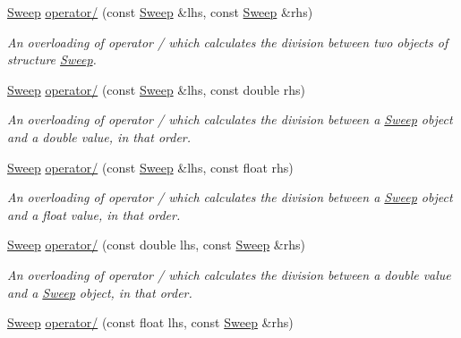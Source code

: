 \begin{DoxyCompactItemize}
\hyperlink{structSweep}{Sweep} \hyperlink{structSweep_a3e230f15cb1119940203a1a452676b74}{operator/} (const \hyperlink{structSweep}{Sweep} \&lhs, const \hyperlink{structSweep}{Sweep} \&rhs)
\begin{DoxyCompactList}\small\item\em An overloading of operator / which calculates the division between two objects of structure {\itshape \hyperlink{structSweep}{Sweep}}. \end{DoxyCompactList}\item 
\hyperlink{structSweep}{Sweep} \hyperlink{structSweep_a910534263202da65edd97a56f0b8fd05}{operator/} (const \hyperlink{structSweep}{Sweep} \&lhs, const double rhs)
\begin{DoxyCompactList}\small\item\em An overloading of operator / which calculates the division between a {\itshape \hyperlink{structSweep}{Sweep}} object and a {\itshape double} value, in that order. \end{DoxyCompactList}\item 
\mbox{\label{structSweep_a73694ded6e7ba41c367ca5f0934cbc2c}} 
\hyperlink{structSweep}{Sweep} \hyperlink{structSweep_a73694ded6e7ba41c367ca5f0934cbc2c}{operator/} (const \hyperlink{structSweep}{Sweep} \&lhs, const float rhs)
\begin{DoxyCompactList}\small\item\em An overloading of operator / which calculates the division between a {\itshape \hyperlink{structSweep}{Sweep}} object and a {\itshape float} value, in that order. \end{DoxyCompactList}\item 
\hyperlink{structSweep}{Sweep} \hyperlink{structSweep_a2129cedcd680ae14f2f5b91dbc0c1807}{operator/} (const double lhs, const \hyperlink{structSweep}{Sweep} \&rhs)
\begin{DoxyCompactList}\small\item\em An overloading of operator / which calculates the division between a {\itshape double} value and a {\itshape \hyperlink{structSweep}{Sweep}} object, in that order. \end{DoxyCompactList}\item 
\mbox{\label{structSweep_abe3c133bf246f7faebcfda286c5e1448}} 
\hyperlink{structSweep}{Sweep} \hyperlink{structSweep_abe3c133bf246f7faebcfda286c5e1448}{operator/} (const float lhs, const \hyperlink{structSweep}{Sweep} \&rhs)

\end{DoxyCompactItemize}
